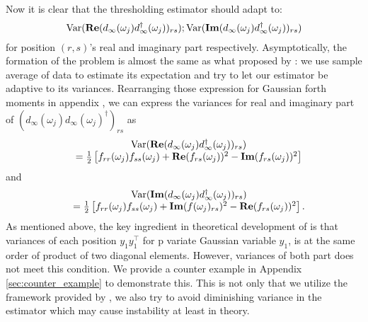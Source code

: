 Now it is clear that the thresholding estimator should adapt to: 
\[
\mathrm{Var}(\mathbf{Re}(d_{\infty}(\omega_j)d^\dag_{\infty}(\omega_j))_{rs}); 
\mathrm{Var}(\mathbf{Im}(d_{\infty}(\omega_j)d^\dag_{\infty}(\omega_j))_{rs})
\]
for position $(r,s)$'s real and imaginary part respectively. Asymptotically, the formation of the problem is almost the same as what proposed by \cite{cai2011adaptive}: we use sample average of data to estimate its expectation and try to let our estimator be adaptive to its variances. Rearranging those expression for Gaussian forth moments in appendix  , we can express the variances for real and imaginary part of $(d_{\infty}(\omega_j)d_{\infty}(\omega_j)^\dag)_{rs}$ as 
\begin{equation}
\label{eq:variance_of_periodogram}
\begin{array}{cc}
&\mathrm{Var}(\mathbf{Re}(d_{\infty}(\omega_j)d^\dag_{\infty}(\omega_j))_{rs})      \\
& = \frac{1}{2}\left[f_{rr}(\omega_j)f_{ss}(\omega_j)+\mathbf{Re}(f_{rs}(\omega_j))^2-\mathbf{Im}(f_{rs}(\omega_j))^2\right]
\end{array}
\end{equation}
and 
\begin{equation}
\begin{array}{cc}
&\mathrm{Var}(\mathbf{Im}(d_{\infty}(\omega_j)d^\dag_{\infty}(\omega_j))_{rs})      \\
& = \frac{1}{2}\left[f_{rr}(\omega_j)f_{ss}(\omega_j)+\mathbf{Im}(f(\omega_j)_{rs})^2-\mathbf{Re}(f_{rs}(\omega_j))^2\right].
\end{array}
\end{equation}
As mentioned above, the key ingredient in theoretical development of \cite{cai2011adaptive} is that variances of each position $y_1y_1^\top$ for p variate Gaussian variable $y_1$,  is at the same order of product of two diagonal elements. However, variances of both part does not meet this condition. We provide a counter example in Appendix \ref{sec:counter_example} to demonstrate this. 
This is not only that we utilize the framework provided by \cite{cai2011adaptive}, we also try to avoid diminishing variance in the estimator which may cause instability at least in theory. \par 

